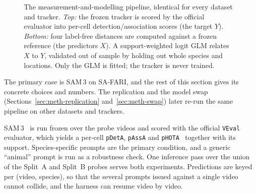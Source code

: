 \begin{figure}[htbp]
\centering
{}
\caption[The measurement-and-modelling pipeline]{The measurement-and-modelling pipeline, identical for every
dataset and tracker. \emph{Top:} the frozen tracker is scored by the official evaluator into per-cell
detection/association scores (the target $Y$). \emph{Bottom:} four label-free distances are computed against a
frozen reference (the predictors $X$). A support-weighted logit GLM relates $X$ to $Y$, validated out of sample
by holding out whole species and locations. Only the GLM is fitted; the tracker is never trained.}
\label{fig:pipeline}
\end{figure}

The primary case is SAM\,3 on SA-FARI, and the rest of this section gives its concrete choices and numbers.
The replication and the model swap (Sections~\ref{sec:meth-replication} and~\ref{sec:meth-swap}) later re-run
the same pipeline on other datasets and trackers.

SAM\,3~\cite{sam3} is run frozen over the probe videos and scored with the official \texttt{VEval} evaluator,
which yields a per-cell \texttt{pDetA}, \texttt{pAssA} and \texttt{pHOTA}~\cite{hota} together with its
support. Species-specific prompts are the primary condition, and a generic ``animal'' prompt is run as a
robustness check. One inference pass over the union of the Split~A and Split~B probes serves both experiments.
Predictions are keyed per (video, species), so that the several prompts issued against a single video cannot
collide, and the harness can resume video by video.

